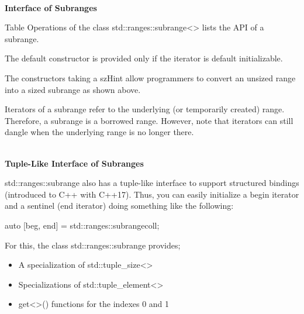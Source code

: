 \noindent
\hspace*{\fill} \\ %
\textbf{Interface of Subranges}

Table Operations of the class std::ranges::subrange<> lists the API of a subrange.

The default constructor is provided only if the iterator is default initializable.

The constructors taking a szHint allow programmers to convert an unsized range into a sized subrange as shown above.

Iterators of a subrange refer to the underlying (or temporarily created) range. Therefore, a subrange is a borrowed range. However, note that iterators can still dangle when the underlying range is no longer there.

\noindent
\hspace*{\fill} \\ %
\textbf{Tuple-Like Interface of Subranges}

std::ranges::subrange also has a tuple-like interface to support structured bindings (introduced to C++ with C++17). Thus, you can easily initialize a begin iterator and a sentinel (end iterator) doing something like the following:

\begin{cpp}
auto [beg, end] = std::ranges::subrange{coll};
\end{cpp}

For this, the class std::ranges::subrange provides;

\begin{itemize}
\item
A specialization of std::tuple\_size<>

\item
Specializations of std::tuple\_element<>

\item
get<>() functions for the indexes 0 and 1
\end{itemize}

